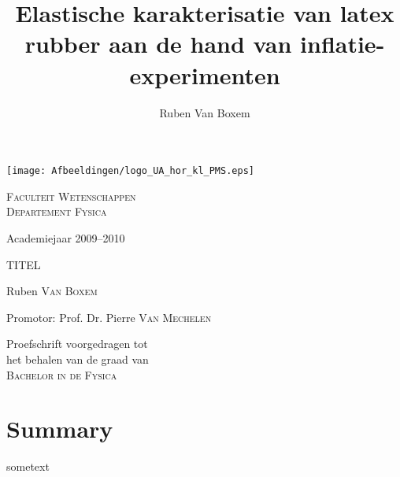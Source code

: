 \documentclass[a4paper,11pt]{article}
\title{Elastische karakterisatie van latex rubber aan de hand van inflatie-experimenten}
\author{Ruben Van Boxem}
\numberwithin{equation}{section} %
\begin{document}
\fontsize{12pt}{14pt}\selectfont

\begin{center}


\texttt{[image: Afbeeldingen/logo\_UA\_hor\_kl\_PMS.eps]}

\vspace{1cm}

\fontsize{14pt}{17pt}\selectfont
\textsc{Faculteit Wetenschappen} \\
\textsc{Departement Fysica}
\fontsize{12pt}{14pt}\selectfont
\vspace{0.3cm}

\vspace{1.2cm}

Academiejaar 2009--2010

\vspace{2.8cm}

\fontsize{17.28pt}{21pt}\selectfont

\textsc{TITEL}

\fontsize{12pt}{14pt}\selectfont

\vspace{3cm}

Ruben \textsc{Van Boxem}	


\vspace{2cm}

Promotor: Prof. Dr. Pierre \textsc{Van Mechelen}\\
\vspace{2cm}
\end{center}
Proefschrift voorgedragen tot \\
het behalen van de graad van\\
\textsc{Bachelor in de Fysica}


\thispagestyle{empty}
\newpage

\section*{Summary}

\newpage
sometext
\end{document}
